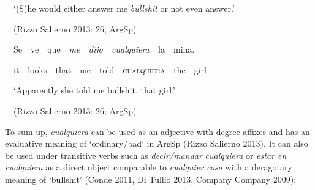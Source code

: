 \begin{styleStandard}
\ \ ‘(S)he would either answer me \textit{bullshit} or not even answer.’
\end{styleStandard}

\begin{styleStandard}
\ \ (Rizzo Salierno 2013: 26; ArgSp)
\end{styleStandard}

\begin{styleStandard}
\ \ Se\ \ ve\ \ que\ \ \textit{me\ \ dijo\ \ cualquiera\ \ }la\ \ mina.
\end{styleStandard}

\begin{styleStandard}
\ \ it\ \ looks\ \ that\ \ me\ \ told\ \ \textsc{cualquiera}\ \ the\ \ girl
\end{styleStandard}

\begin{styleStandard}
\ \ ‘Apparently she told me bullshit, that girl.’
\end{styleStandard}

\begin{styleStandard}
\ \ (Rizzo Salierno 2013: 26; ArgSp)
\end{styleStandard}

\begin{styleStandard}
To sum up, \textit{cualquiera} can be used as an adjective with degree affixes and has an evaluative meaning of ‘ordinary/bad’ in ArgSp (Rizzo Salierno 2013). It can also be used under transitive verbs such as \textit{decir/mandar} \textit{cualquiera} or \textit{estar en cualquiera} as a direct object comparable to \textit{cualquier cosa} with a deragotary meaning of ‘bullshit’ (Conde 2011, Di Tullio 2013, Company Company 2009):
\end{styleStandard}

